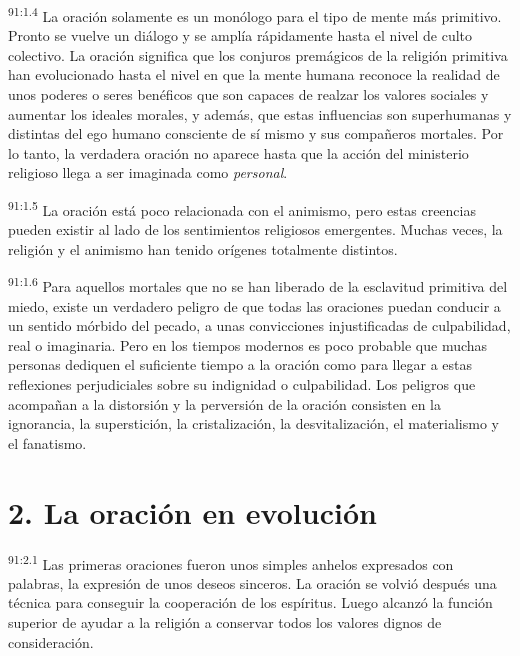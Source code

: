 \documentclass[twoside, 11pt]{book}
\begin{document}
\par
\textsuperscript{91:1.4} La oración solamente es un monólogo para el tipo de mente más primitivo. Pronto se vuelve un diálogo y se amplía rápidamente hasta el nivel de culto colectivo. La oración significa que los conjuros premágicos de la religión primitiva han evolucionado hasta el nivel en que la mente humana reconoce la realidad de unos poderes o seres benéficos que son capaces de realzar los valores sociales y aumentar los ideales morales, y además, que estas influencias son superhumanas y distintas del ego humano consciente de sí mismo y sus compañeros mortales. Por lo tanto, la verdadera oración no aparece hasta que la acción del ministerio religioso llega a ser imaginada como \textit{personal}.

\par
\textsuperscript{91:1.5} La oración está poco relacionada con el animismo, pero estas creencias pueden existir al lado de los sentimientos religiosos emergentes. Muchas veces, la religión y el animismo han tenido orígenes totalmente distintos.

\par
\textsuperscript{91:1.6} Para aquellos mortales que no se han liberado de la esclavitud primitiva del miedo, existe un verdadero peligro de que todas las oraciones puedan conducir a un sentido mórbido del pecado, a unas convicciones injustificadas de culpabilidad, real o imaginaria. Pero en los tiempos modernos es poco probable que muchas personas dediquen el suficiente tiempo a la oración como para llegar a estas reflexiones perjudiciales sobre su indignidad o culpabilidad. Los peligros que acompañan a la distorsión y la perversión de la oración consisten en la ignorancia, la superstición, la cristalización, la desvitalización, el materialismo y el fanatismo.

\section*{2. La oración en evolución}
\par
\textsuperscript{91:2.1} Las primeras oraciones fueron unos simples anhelos expresados con palabras, la expresión de unos deseos sinceros. La oración se volvió después una técnica para conseguir la cooperación de los espíritus. Luego alcanzó la función superior de ayudar a la religión a conservar todos los valores dignos de consideración.
\end{document}
